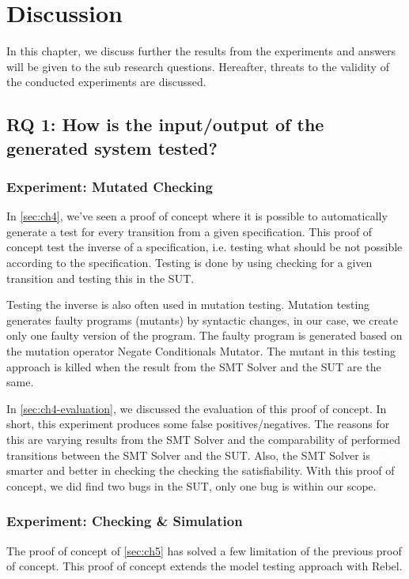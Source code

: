 \chapter{Discussion}

In this chapter, we discuss further the results from the experiments and answers will be given to the sub research questions. Hereafter, threats to the validity of the conducted experiments are discussed.

\section{RQ 1: How is the input/output of the generated system tested?}

\subsection{Experiment: Mutated Checking}
In \autoref{sec:ch4}, we've seen a proof of concept where it is possible to automatically generate a test for every transition from a given specification. This proof of concept test the inverse of a specification, i.e. testing what should be not possible according to the specification. Testing is done by using checking for a given transition and testing this in the SUT.

Testing the inverse is also often used in mutation testing. Mutation testing generates faulty programs (mutants) by syntactic changes, in our case, we create only one faulty version of the program. The faulty program is generated based on the mutation operator Negate Conditionals Mutator. The mutant in this testing approach is killed when the result from the SMT Solver and the SUT are the same.

In \autoref{sec:ch4-evaluation}, we discussed the evaluation of this proof of concept. In short, this experiment produces some false positives/negatives. The reasons for this are varying results from the SMT Solver and the comparability of performed transitions between the SMT Solver and the SUT. Also, the SMT Solver is smarter and better in checking the checking the satisfiability. With this proof of concept, we did find two bugs in the SUT, only one bug is within our scope.


\subsection{Experiment: Checking & Simulation}
The proof of concept of \autoref{sec:ch5} has solved a few limitation of the previous proof of concept. This proof of concept extends the model testing approach with Rebel.

